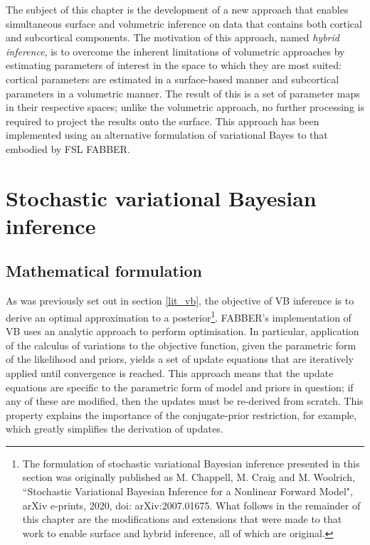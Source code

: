 \documentclass[12pt]{report}
\begin{document}
The subject of this chapter is the development of a new approach that enables simultaneous surface and volumetric inference on data that contains both cortical and subcortical components. The motivation of this approach, named \textit{hybrid inference}, is to overcome the inherent limitations of volumetric approaches by estimating parameters of interest in the space to which they are most suited: cortical parameters are estimated in a surface-based manner and subcortical parameters in a volumetric manner. The result of this is a set of parameter maps in their respective spaces; unlike the volumetric approach, no further processing is required to project the results onto the surface. This approach has been implemented using an alternative formulation of variational Bayes to that embodied by FSL FABBER. 

\section{Stochastic variational Bayesian inference}

\subsection{Mathematical formulation}

As was previously set out in section \ref{lit_vb}, the objective of VB inference is to derive an optimal approximation to a posterior\footnote{The formulation of stochastic variational Bayesian inference presented in this section was originally published as M. Chappell, M. Craig and M. Woolrich, ``Stochastic Variational Bayesian Inference for a Nonlinear Forward Model", arXiv e-prints, 2020, doi: arXiv:2007.01675. What follows in the remainder of this chapter are the modifications and extensions that were made to that work to enable surface and hybrid inference, all of which are original.}. FABBER's implementation of VB uses an analytic approach to perform optimisation. In particular, application of the calculus of variations to the objective function, given the parametric form of the likelihood and priors, yields a set of update equations that are iteratively applied until convergence is reached. This approach means that the update equations are specific to the parametric form of model and priors in question; if any of these are modified, then the updates must be re-derived from scratch. This property explains the importance of the conjugate-prior restriction, for example, which greatly simplifies the derivation of updates. 
\end{document}
